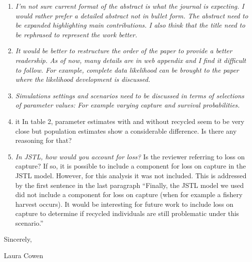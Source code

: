 \documentclass[12pt]{article}
\begin{document}
\bigskip

\begin{enumerate}
\item  {\it I’m not sure current format of the abstract is what the journal is expecting. I would rather prefer a detailed abstract not in bullet form. The abstract need to be expanded highlighting main contributions.   I also think that the title need to be rephrased to represent the work better. }

\item {\it It would be better to restructure the order of the paper to provide a better readership. As of now, many details are in web appendix and I find it difficult to follow. For example, complete data likelihood can be brought to the paper where the likelihood development is discussed.}

\item {\it Simulations settings and scenarios need to be discussed in terms of selections of parameter values: For example varying capture and survival probabilities.}

\item {it In table 2, parameter estimates with and without recycled seem to be very close but population estimates show a considerable difference. Is there any reasoning for that?}

\item {\it In JSTL, how would you account for loss?}
Is the reviewer referring to loss on capture? If so, it is possible to include a component for loss on capture in the JSTL model. However, for this analysis it was not included. This is addressed by the first sentence in the last paragraph ``Finally, the JSTL model we used did not include a component for loss on capture (when for example a fishery harvest occurs).  It would be interesting for future work to include loss on capture to determine if recycled individuals are still problematic under this scenario.''
\end{enumerate}





\noindent Sincerely,

\bigskip

\bigskip


\noindent Laura Cowen
\end{document}
